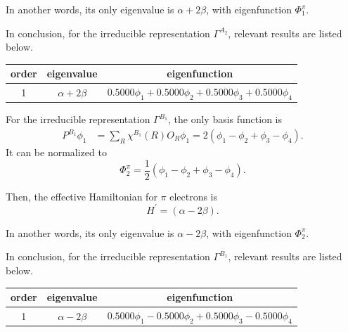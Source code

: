 \documentclass[a4paper]{book}
\begin{document}
\begin{solution}
\begin{enumerate}[label=(\alph*)]
		In another words, its only eigenvalue is $\alpha + 2\beta$, with eigenfunction $\Phi^\pi_1$.
		
		In conclusion, for the irreducible representation $\Gamma^{A_2}$, relevant results are listed below.
		
		\begin{center}
		\setlength{\abovecaptionskip}{0em}
		\begin{tabular}{ccc}\hline
		  order	&	eigenvalue		& 	eigenfunction	\\ \hline
			1	&$\alpha+2\beta$& 	$0.5000\phi_1 + 0.5000 \phi_2 + 0.5000 \phi_3 + 0.5000 \phi_4$ \\ \hline
		\end{tabular}
		\end{center}
		
		For the irreducible representation $\Gamma^{B_1}$, the only basis function is
		\begin{align*}
			P^{B_1}\phi_1 &= \sum_{R} \chi^{B_1}(R) O_R \phi_1 = 2(\phi_1 - \phi_2 + \phi_3 - \phi_4).
		\end{align*}
		It can be normalized to
		\begin{equation}
			\Phi^\pi_2 = \frac{1}{2}(\phi_1 - \phi_2 + \phi_3 -\phi_4).
		\end{equation}
		
		Then, the effective Hamiltonian for $\pi$ electrons is
		\begin{equation*}
			H^\prime = ( \alpha - 2\beta ).		
		\end{equation*}
		
		In another words, its only eigenvalue is $\alpha - 2\beta$, with eigenfunction $\Phi^\pi_2$.
		
		In conclusion, for the irreducible representation $\Gamma^{B_1}$, relevant results are listed below.
		
		\begin{center}
		\setlength{\abovecaptionskip}{0em}
		\begin{tabular}{ccc}\hline
		  order	&	eigenvalue		& 	eigenfunction	\\ \hline
			1	&$\alpha-2\beta$& 	$0.5000\phi_1 - 0.5000 \phi_2 + 0.5000 \phi_3 - 0.5000 \phi_4$ \\ \hline
		\end{tabular}
		\end{center}
		

\end{enumerate}
\end{solution}
\end{document}
